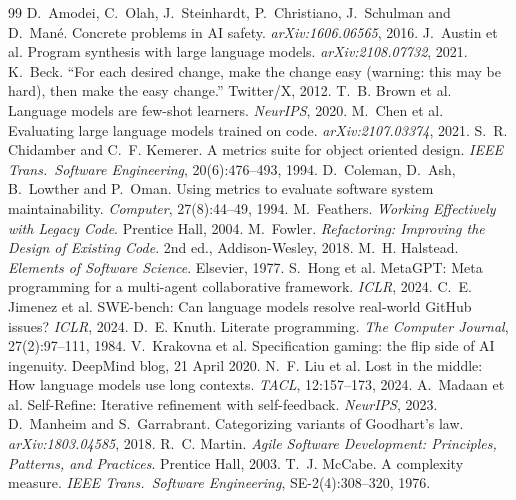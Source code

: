 \documentclass[11pt]{article}
\begin{document}
\begin{thebibliography}{99}
\small
{} D.~Amodei, C.~Olah, J.~Steinhardt, P.~Christiano, J.~Schulman and D.~Mané. Concrete problems in AI safety. \emph{arXiv:1606.06565}, 2016.
 J.~Austin et al. Program synthesis with large language models. \emph{arXiv:2108.07732}, 2021.
 K.~Beck. ``For each desired change, make the change easy (warning: this may be hard), then make the easy change.'' Twitter/X, 2012.
 T.~B. Brown et al. Language models are few-shot learners. \emph{NeurIPS}, 2020.
 M.~Chen et al. Evaluating large language models trained on code. \emph{arXiv:2107.03374}, 2021.
 S.~R. Chidamber and C.~F. Kemerer. A metrics suite for object oriented design. \emph{IEEE Trans.\ Software Engineering}, 20(6):476--493, 1994.
 D.~Coleman, D.~Ash, B.~Lowther and P.~Oman. Using metrics to evaluate software system maintainability. \emph{Computer}, 27(8):44--49, 1994.
 M.~Feathers. \emph{Working Effectively with Legacy Code}. Prentice Hall, 2004.
 M.~Fowler. \emph{Refactoring: Improving the Design of Existing Code}. 2nd ed., Addison-Wesley, 2018.
 M.~H. Halstead. \emph{Elements of Software Science}. Elsevier, 1977.
 S.~Hong et al. MetaGPT: Meta programming for a multi-agent collaborative framework. \emph{ICLR}, 2024.
 C.~E. Jimenez et al. SWE-bench: Can language models resolve real-world GitHub issues? \emph{ICLR}, 2024.
 D.~E. Knuth. Literate programming. \emph{The Computer Journal}, 27(2):97--111, 1984.
 V.~Krakovna et al. Specification gaming: the flip side of AI ingenuity. DeepMind blog, 21 April 2020.
 N.~F. Liu et al. Lost in the middle: How language models use long contexts. \emph{TACL}, 12:157--173, 2024.
 A.~Madaan et al. Self-Refine: Iterative refinement with self-feedback. \emph{NeurIPS}, 2023.
 D.~Manheim and S.~Garrabrant. Categorizing variants of Goodhart's law. \emph{arXiv:1803.04585}, 2018.
 R.~C. Martin. \emph{Agile Software Development: Principles, Patterns, and Practices}. Prentice Hall, 2003.
 T.~J. McCabe. A complexity measure. \emph{IEEE Trans.\ Software Engineering}, SE-2(4):308--320, 1976.

\end{thebibliography}
\end{document}
